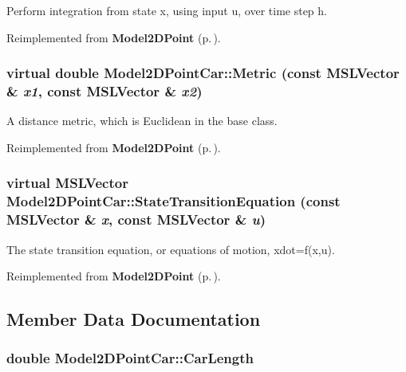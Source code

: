 Perform integration from state x, using input u, over time step h.



Reimplemented from {\bf Model2DPoint} {\rm (p.\,\pageref{class_Model2DPoint_a2})}.
\subsubsection{\setlength{\rightskip}{0pt plus 5cm}virtual double Model2DPoint\-Car::Metric (const {\bf MSLVector} \& {\em x1}, const {\bf MSLVector} \& {\em x2})\hspace{0.3cm}{\tt  [virtual]}}\label{class_Model2DPointCar_a4}


A distance metric, which is Euclidean in the base class.



Reimplemented from {\bf Model2DPoint} {\rm (p.\,\pageref{class_Model2DPoint_a4})}.
\subsubsection{\setlength{\rightskip}{0pt plus 5cm}virtual {\bf MSLVector} Model2DPoint\-Car::State\-Transition\-Equation (const {\bf MSLVector} \& {\em x}, const {\bf MSLVector} \& {\em u})\hspace{0.3cm}{\tt  [virtual]}}\label{class_Model2DPointCar_a3}


The state transition equation, or equations of motion, xdot=f(x,u).



Reimplemented from {\bf Model2DPoint} {\rm (p.\,\pageref{class_Model2DPoint_a3})}.

\subsection{Member Data Documentation}
\subsubsection{\setlength{\rightskip}{0pt plus 5cm}double Model2DPoint\-Car::Car\-Length}\label{class_Model2DPointCar_m1}


